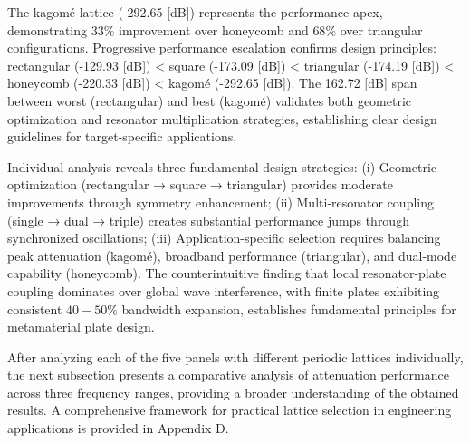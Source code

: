 \documentclass[review,numbers,sort&compress]{elsarticle}
\begin{document}
The kagomé lattice (-292.65 [dB]) represents the performance apex, demonstrating $33\%$ improvement over honeycomb and $68\%$ over triangular configurations. Progressive performance escalation confirms design principles: rectangular (-129.93 [dB]) < square (-173.09 [dB]) < triangular (-174.19 [dB]) < honeycomb (-220.33 [dB]) < kagomé (-292.65 [dB]). The 162.72 [dB] span between worst (rectangular) and best (kagomé) validates both geometric optimization and resonator multiplication strategies, establishing clear design guidelines for target-specific applications.

Individual analysis reveals three fundamental design strategies: (i) Geometric optimization (rectangular → square → triangular) provides moderate improvements through symmetry enhancement; (ii) Multi-resonator coupling (single → dual → triple) creates substantial performance jumps through synchronized oscillations; (iii) Application-specific selection requires balancing peak attenuation (kagomé), broadband performance (triangular), and dual-mode capability (honeycomb). The counterintuitive finding that local resonator-plate coupling dominates over global wave interference, with finite plates exhibiting consistent $40-50\%$ bandwidth expansion, establishes fundamental principles for metamaterial plate design.

After analyzing each of the five panels with different periodic lattices individually, the next subsection presents a comparative analysis of attenuation performance across three frequency ranges, providing a broader understanding of the obtained results. A comprehensive framework for practical lattice selection in engineering applications is provided in Appendix D.

\end{document}
